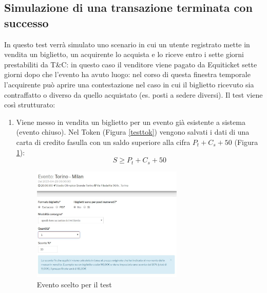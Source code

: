 \subsection{Simulazione di una transazione terminata con successo}
In questo test verrà simulato uno scenario in cui un utente registrato mette in vendita un biglietto, un acquirente lo acquista e lo riceve entro i sette giorni prestabiliti da T\&C: in questo caso il venditore viene pagato da Equiticket sette giorni dopo che l'evento ha avuto luogo: nel corso di questa finestra temporale l'acquirente può aprire una contestazione nel caso in cui il biglietto ricevuto sia contraffatto o diverso da quello acquistato (es. posti a sedere diversi). 
Il test viene così strutturato: 
\begin{enumerate}
\item Viene messo in vendita un biglietto per un evento già esistente a sistema (evento chiuso). Nel Token (Figura \ref{testtok}) vengono salvati i dati di una carta di credito fasulla con un saldo superiore alla cifra $P_{t} + C_{s} + 50$ (Figura \ref{testev}): 
\begin{equation}
S \geq{P_{t} + C_{s} + 50}
\end{equation}
\begin{figure}[htbp]
	\centering
	\includegraphics[width=0.68\textwidth]{chapter4/immagini/test_vendi}
	\caption{Evento scelto per il test}
	\label{testev}
\end{figure}
\begin{figure}[htbp]
	\centering

\end{figure}
\end{enumerate}
